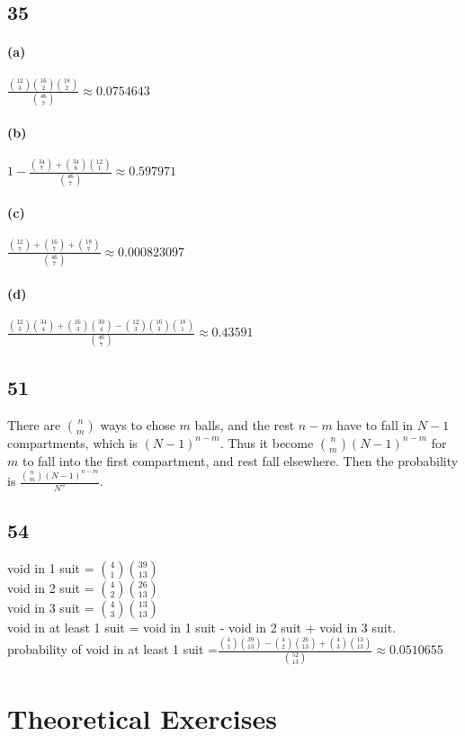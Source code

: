 \documentclass[letter]{article}
\begin{document}
\subsection*{35}
\paragraph*{(a)}
$\frac{{12\choose 3}{16\choose 2}{18\choose 2}}{{46\choose 7}}\approx 0.0754643$
\paragraph*{(b)}
$1 - \frac{{34\choose 7}+{34\choose 6}{12\choose 1}}{{46\choose 7}} \approx 0.597971$
\paragraph*{(c)}
$\frac{{12\choose 7}+{16\choose 7}+{18\choose 7}}{{46 \choose 7}}\approx 0.000823097$
\paragraph*{(d)}
$
\frac{{12\choose 3}{34\choose 4}+{16\choose 3}{30\choose 4}-{12\choose 3}{16\choose 3}{18\choose 1}}{{46\choose 7}}\approx 0.43591
$
\subsection*{51}
There are ${n \choose m}$ ways to chose $m$ balls, and the rest $n-m$ have to fall in $N-1$ compartments, which is $(N-1)^{n-m}$. Thus it become ${n \choose m}(N-1)^{n-m}$ for $m$ to fall into the first compartment, and rest fall elsewhere. Then the probability is $\frac{{n\choose m}(N-1)^{n-m}}{N^n}$.

\subsection*{54}
void in 1 suit = ${4 \choose 1}{39 \choose 13}$\\
void in 2 suit = ${4 \choose 2}{26 \choose 13}$\\
void in 3 suit = ${4 \choose 3}{13 \choose 13}$\\
void in at least 1 suit = void in 1 suit - void in 2 suit + void in 3 suit.\\
probability of void in at least 1 suit =$\frac{{4 \choose 1}{39 \choose 13}-{4 \choose 2}{26 \choose 13}+{4 \choose 3}{13 \choose 13}}{{52\choose 13}}\approx 0.0510655$

\section*{Theoretical Exercises}
\end{document}
